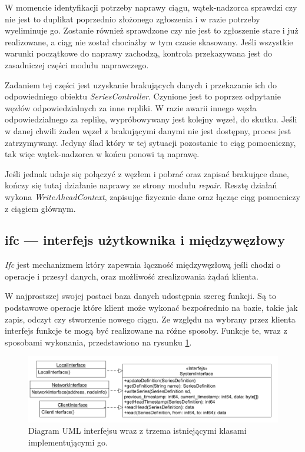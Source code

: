 \documentclass[a4paper,polish,12pt,twoside]{article}
\begin{document}
W momencie identyfikacji potrzeby naprawy ciągu, wątek-nadzorca sprawdzi czy nie jest to duplikat poprzednio złożonego zgłoszenia i w razie potrzeby wyeliminuje go. Zostanie również sprawdzone czy nie jest to zgłoszenie stare i już realizowane, a ciąg nie został chociażby w tym czasie skasowany. Jeśli wszystkie warunki początkowe do naprawy zachodzą, kontrola przekazywana jest do zasadniczej części modułu naprawczego. 

Zadaniem tej części jest uzyskanie brakujących danych i przekazanie ich do odpowiedniego obiektu \textit{SeriesController}. Czynione jest to poprzez odpytanie węzłów odpowiedzialnych za inne repliki. W razie awarii innego węzła odpowiedzialnego za replikę, wypróbowywany jest kolejny węzeł, do skutku. Jeśli w danej chwili żaden węzeł z brakującymi danymi nie jest dostępny, proces jest zatrzymywany. Jedyny ślad który w tej sytuacji pozostanie to ciąg pomocniczny, tak więc wątek-nadzorca w końcu ponowi tą naprawę. 

Jeśli jednak udaje się połączyć z węzłem i pobrać oraz zapisać brakujące dane, kończy się tutaj działanie naprawy ze strony modułu \textit{repair}. Resztę działań wykona \textit{WriteAheadContext}, zapisując fizycznie dane oraz łącząc ciąg pomocniczy z ciągiem głównym.

\subsection{ifc --- interfejs użytkownika i międzywęzłowy}
\textit{Ifc} jest mechanizmem który zapewnia łączność międzywęzłową jeśli chodzi o operacje i przesył danych, oraz możliwość zrealizowania żądań klienta. 

W najprostszej swojej postaci baza danych udostępnia szereg funkcji. Są to podstawowe operacje które klient może wykonać bezpośrednio na bazie, takie jak zapis, odczyt czy stworzenie nowego ciągu. Ze względu na wybrany przez klienta interfejs funkcje te mogą być realizowane na różne sposoby. Funkcje te, wraz z sposobami wykonania, przedstawiono na rysunku \ref{fig:uml_ifc}. 

	\begin{figure}[h]
		\centering \includegraphics[width=16cm]{uml_ifc}
		\caption{Diagram UML interfejsu wraz z trzema istniejącymi klasami implementującymi go.}
		\label{fig:uml_ifc}
	\end{figure}
\end{document}
